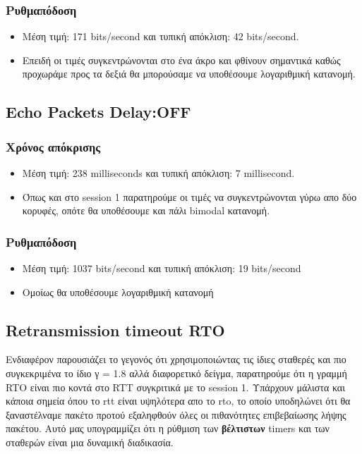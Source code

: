 \documentclass[hidelinks, 12pt, a4paper]{article}
\begin{document}
\subsubsection{Ρυθμαπόδοση}

\begin{itemize}
    \item Μέση τιμή: 171 bits/second και τυπική απόκλιση: 42 bits/second.
    \item Επειδή οι τιμές συγκεντρώνονται στο ένα άκρο και φθίνουν σημαντικά καθώς προχωράμε προς τα δεξιά θα μπορούσαμε να υποθέσουμε λογαριθμική κατανομή.
\end{itemize}

\subsection{Echo Packets Delay:OFF}
\subsubsection{Χρόνος απόκρισης}

\begin{itemize}
    \item Μέση τιμή: 238 milliseconds και τυπική απόκλιση: 7 millisecond.
    \item Όπως και στο session 1 παρατηρούμε οι τιμές να συγκεντρώνονται γύρω απο δύο κορυφές, οπότε θα υποθέσουμε και πάλι bimodal κατανομή.
\end{itemize}

\subsubsection{Ρυθμαπόδοση}

\begin{itemize}
    \item Μέση τιμή: 1037 bits/second και τυπική απόκλιση: 19 bits/second
    \item Ομοίως θα υποθέσουμε λογαριθμική κατανομή
\end{itemize}

\subsection{Retransmission timeout RTO}

Ενδιαφέρον παρουσιάζει το γεγονός ότι χρησιμοποιώντας τις ίδιες σταθερές και πιο συγκεκριμένα το ίδιο γ = 1.8 αλλά διαφορετικό δείγμα, παρατηρούμε ότι η γραμμή RTO είναι πιο κοντά στο RTT συγκριτικά με το session 1. Υπάρχουν μάλιστα και κάποια σημεία όπου το rtt είναι υψηλότερα απο το rto, το οποίο υποδηλώνει ότι θα ξαναστέλναμε πακέτο προτού εξαληφθούν όλες οι πιθανότητες επιβεβαίωσης λήψης πακέτου. Αυτό μας υπογραμμίζει ότι η ρύθμιση των \textbf{βέλτιστων} timers και των σταθερών είναι μια δυναμική διαδικασία.
\end{document}

